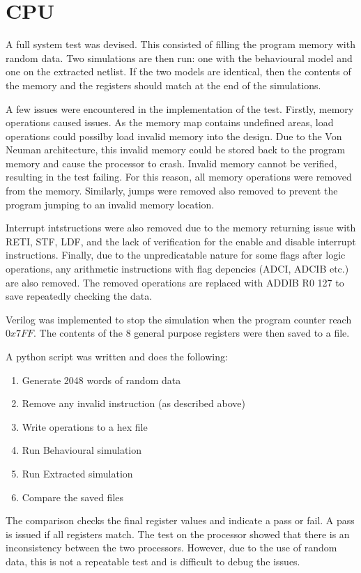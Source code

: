 
\section{CPU}

A full system test was devised. 
This consisted of filling the program memory with random data. 
Two simulations are then run: one with the behavioural model and one on the extracted netlist. 
If the two models are identical, then the contents of the memory and the registers should match at the end of the simulations.

A few issues were encountered in the implementation of the test.
Firstly, memory operations caused issues. 
As the memory map contains undefined areas, load operations could possilby load invalid memory into the design.
Due to the Von Neuman architecture, this invalid memory could be stored back to the program memory and cause the processor to crash. 
Invalid memory cannot be verified, resulting in the test failing. 
For this reason, all memory operations were removed from the memory.
Similarly, jumps were removed also removed to prevent the program jumping to an invalid memory location. 

Interrupt intstructions were also removed due to the memory returning issue with RETI, STF, LDF, and the lack of verification for the enable and disable interrupt instructions. 
Finally, due to the unpredicatable nature for some flags after logic operations, any arithmetic instructions with flag depencies (ADCI, ADCIB etc.) are also removed. 
The removed operations are replaced with ADDIB R0 127 to save repeatedly checking the data. 

Verilog was implemented to stop the simulation when the program counter reach $0x7FF$. 
The contents of the 8 general purpose registers were then saved to a file. 


A python script was written and does the following:
\begin{enumerate}
\item Generate 2048 words of random data
\item Remove any invalid instruction (as described above)
\item Write operations to a hex file
\item Run Behavioural simulation
\item Run Extracted simulation
\item Compare the saved files
\end{enumerate}

The comparison checks the final register values and indicate a pass or fail. 
A pass is issued if all registers match. 
The test on the processor showed that there is an inconsistency between the two processors.
However, due to the use of random data, this is not a repeatable test and is difficult to debug the issues. 

